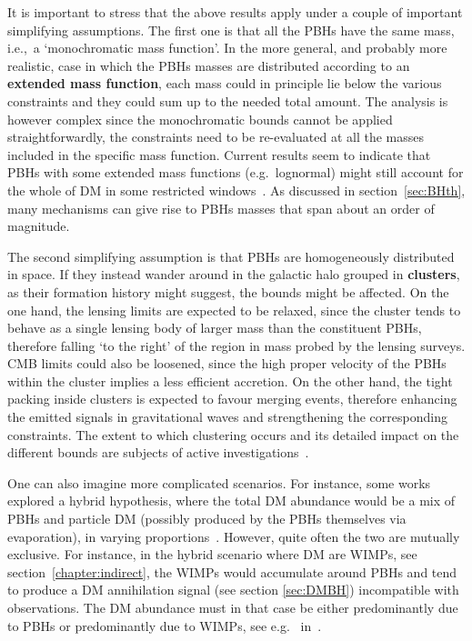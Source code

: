 \medskip

It is important to stress that the above results apply under a couple of important simplifying assumptions. The first one is that all the PBHs have the same mass, i.e.,~a `monochromatic mass function'. In the more general, and probably more realistic, case in which the PBHs masses are distributed according to an {\bf extended mass function}, each mass could in principle lie below the various constraints and they could sum up to the needed total amount. The analysis is however complex since the monochromatic bounds cannot be applied straightforwardly, the constraints need to be re-evaluated at all the masses included in the specific mass function. Current results seem to indicate that PBHs with some extended mass functions (e.g.~lognormal) might still account for the whole of DM in some restricted windows~\cite{PBHextendedmassfunction}.
As discussed in section~\ref{sec:BHth}, many mechanisms can give rise to PBHs masses that span about an order of magnitude.



The second simplifying assumption is that PBHs are homogeneously distributed in space. If they instead wander around in the galactic halo grouped in {\bf clusters}, as their formation history might suggest, the bounds might be affected. On the one hand, the lensing limits are expected to be relaxed, since the cluster
tends to behave as a single lensing body of larger mass than the constituent PBHs, therefore falling `to the right' of the region in mass probed by the lensing surveys. 
CMB limits could also be loosened, since the high proper velocity of the PBHs within the cluster implies a less efficient accretion.
On the other hand, the tight packing inside clusters is expected to favour merging events, 
therefore enhancing the emitted signals in gravitational waves and strengthening the corresponding constraints. 
The extent to which clustering occurs and its detailed impact on the different bounds are subjects of active investigations~\cite{PBHclustering}.


\medskip

One can also imagine more complicated scenarios. For instance, some works explored a hybrid hypothesis, where the total DM abundance would be a mix of PBHs and particle DM (possibly produced by the PBHs themselves via evaporation), in varying proportions~\cite{PBHsandWIMPs}. 
However, quite often the two are  mutually exclusive. For instance, in the hybrid scenario where DM are WIMPs,  see section~\ref{chapter:indirect},  the WIMPs would accumulate around PBHs and tend to produce a DM annihilation signal (see section \ref{sec:DMBH}) incompatible with observations. 
The DM abundance must in that case be either predominantly due to PBHs or predominantly due to WIMPs,
see e.g.\  in~\cite{PBHsandWIMPs}.




